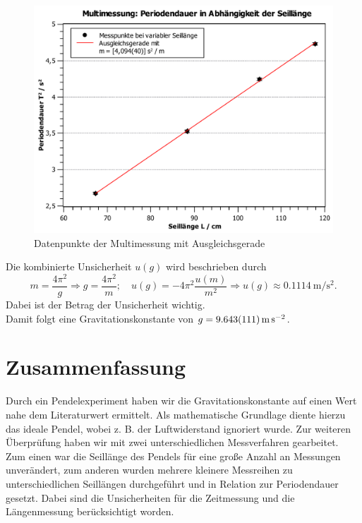 \documentclass[11pt,a4paper,titlepage, ngerman]{article}
\begin{document}
		\begin{figure}[ht]
			\centering
			\includegraphics[width=\textwidth]{SteigungMultimessung_2.pdf}
			\caption{Datenpunkte der Multimessung mit Ausgleichsgerade}
			\label{fig:multi}
		\end{figure}
		
		Die kombinierte Unsicherheit $u(g)$ wird beschrieben durch
		\begin{equation*}
			m = \frac{4 \pi^2}{g} \Rightarrow g = \frac{4 \pi^2}{m};\quad 
			u(g) = -4\pi^2 \frac{u(m)}{m^2} \Rightarrow u(g) \approx \SI{0,1114}{\meter\per\second\squared}.
		\end{equation*}
		Dabei ist der Betrag der Unsicherheit wichtig.\\
		Damit folgt eine Gravitationskonstante von $g = \SI{9,643 +- 0,111}{\meter\per\second\squared}$.
		
	\section{Zusammenfassung}
		Durch ein Pendelexperiment haben wir die Gravitationskonstante auf einen Wert nahe dem Literaturwert ermittelt.
		Als mathematische Grundlage diente hierzu das ideale Pendel, wobei z. B. der Luftwiderstand ignoriert wurde.
		Zur weiteren Überprüfung haben wir mit zwei unterschiedlichen Messverfahren gearbeitet.
		Zum einen war die Seillänge des Pendels für eine große Anzahl an Messungen unverändert, zum anderen wurden mehrere kleinere Messreihen zu unterschiedlichen Seillängen durchgeführt und in Relation zur Periodendauer gesetzt.
		Dabei sind die Unsicherheiten für die Zeitmessung und die Längenmessung berücksichtigt worden.
		
\end{document}
